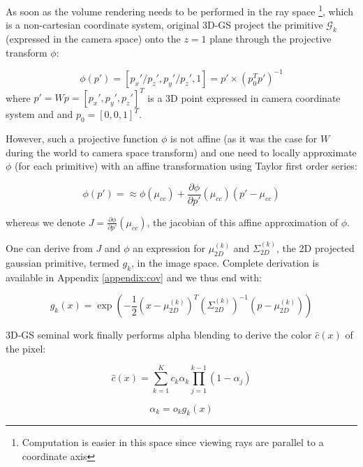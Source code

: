 As soon as the volume rendering needs to be performed in the ray space \footnote{Computation is easier in this space since viewing rays are parallel to a coordinate axis}, which is a non-cartesian coordinate system, original 3D-\ac{GS} project the primitive $\mathcal{G}_{k}$ (expressed in the camera space) onto the $z=1$ plane through the projective transform $\phi$: 

\begin{equation}
  \phi(p') = [p_{x}'/p_{z}',p_{y}'/p_{z}',1] = p'\times(p_{0}^{T}p')^{-1}
\end{equation}
where $p'=Wp = [p_{x}',p_{y}',p_{z}']^{T}$ is a 3D point expressed in camera coordinate system and and $p_{0} = [0, 0, 1]^{T}$. 

However, such a projective function $\phi$ is not affine (as it was the case for $W$ during the world to camera space transform) and one need to locally approximate $\phi$ (for each primitive) with an affine transformation using Taylor first order series: 

\begin{equation}
  \label{eq:affine_transform}
  \phi(p') = \approx \phi(\mu_{cc}) + \frac{\partial \phi}{\partial p'}(\mu_{cc})(p' - \mu_{cc})
\end{equation}

whereas we denote $J = \frac{\partial \phi}{\partial p'}(\mu_{cc})$, the jacobian of this affine approximation of $\phi$. 

One can derive from $J$ and $\phi$ an expression for $\mu^{(k)}_{2D}$ and $\Sigma^{(k)}_{2D}$, the 2D projected gaussian primitive, termed  $g_{k}$, in the image space. Complete derivation is available in Appendix \ref{appendix:cov} and we thus end with: 

\begin{equation}
  g_{k}(x) = \exp(-\frac{1}{2}(x-\mu^{(k)}_{2D})^{T}(\Sigma^{(k)}_{2D})^{-1}(p-\mu^{(k)}_{2D}))
\end{equation}

3D-\ac{GS} seminal work \citep{kerbl20233d} finally performs alpha blending to derive the color $\hat{c}(x)$ of the pixel: 

\begin{equation}
\label{eq:gs-alpha-blending}
  \hat{c}(x) = \sum_{k=1}^{K}c_{k}\alpha_{k}\prod_{j=1}^{k-1}(1-\alpha_{j})
\end{equation}

\begin{equation}
\label{eq:gs-alpha-def}
  \alpha_{k} = o_{k}g_{k}(x)
\end{equation}

